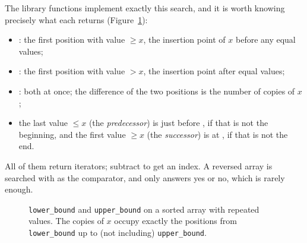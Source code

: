 The library functions implement exactly this search, and it is worth knowing precisely what each returns
(Figure~\ref{fig:lowerupper}):
\begin{itemize}
  \item {}: the first position with value $\ge x$, the insertion point of $x$ before any equal
        values;
  \item {}: the first position with value $> x$, the insertion point after equal values;
  \item {}: both at once; the difference of the two positions is the number of copies of $x$;
  \item the last value $\le x$ (the \emph{predecessor}) is just before , if that is not the beginning, and
        the first value $\ge x$ (the \emph{successor}) is at , if that is not the end.
\end{itemize}
All of them return iterators; subtract  to get an index. A reversed array is searched with
 as the comparator, and  only answers yes or no, which is rarely enough.

\begin{figure}[htbp]
\centering
{}
\caption{\texttt{lower\_bound} and \texttt{upper\_bound} on a sorted array with repeated values. The copies of $x$ occupy
exactly the positions from \texttt{lower\_bound} up to (not including) \texttt{upper\_bound}.}
\label{fig:lowerupper}
\end{figure}

